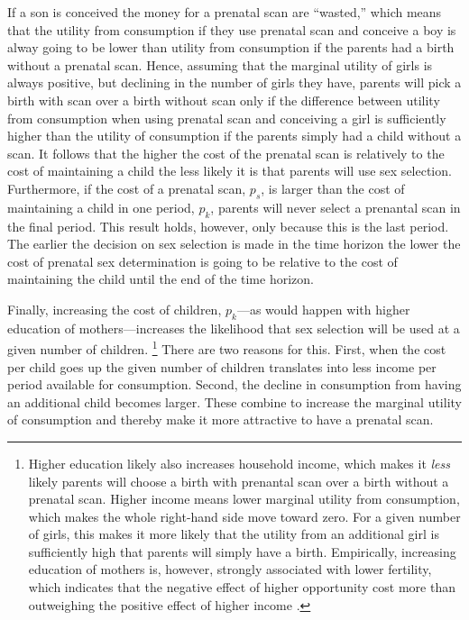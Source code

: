 \documentclass[12pt,letterpaper]{article}
\begin{document}
If a son is conceived the money for a prenatal scan are ``wasted,''
which means that the utility from consumption if they use prenatal scan
and conceive a boy is alway going to be lower than utility from consumption 
if the parents had a birth without a prenatal scan.
Hence, assuming that the marginal utility of girls is always positive,
but declining in the number of girls they have, parents will pick
a birth with scan over a birth without scan only if the difference between
utility from consumption when using prenatal scan and conceiving a girl
is sufficiently higher than the utility of consumption if the parents
simply had a child without a scan.
It follows that the higher the cost of the prenatal scan is relatively
to the cost of maintaining a child the less likely it is that parents will 
use sex selection.
Furthermore, if the cost of a prenatal scan, 
$p_s$, is larger than the cost of maintaining a child in one period, $p_k$, 
parents will never select a prenantal scan in the final period.
This result holds, however, only because this is the last period. 
The earlier the decision on sex selection is made in the time horizon
the lower the cost of prenatal sex determination is going to be 
relative to the cost of maintaining the child until the end of the time
horizon.

Finally, increasing the cost of children, $p_k$---as would happen 
with higher education of mothers---increases the likelihood that sex 
selection will be used at a given number of children.%
\footnote{
Higher education likely also increases household income, which
makes it \emph{less} likely parents will choose a birth with prenantal 
scan over a birth without a prenatal scan.
Higher income means lower marginal utility from consumption, which makes the 
whole right-hand side move toward zero.
For a given number of girls, this makes it more likely 
that the utility from an additional girl is sufficiently high that parents 
will simply have a birth.
Empirically, increasing education of mothers is, however, strongly associated 
with lower fertility, which indicates that 
the negative effect of higher opportunity cost more than outweighing 
the positive effect of higher income \citep{schultz97}.
}
There are two reasons for this.
First,  when the cost per child goes up the given number of children 
translates into less income per period available for consumption.
Second, the decline in consumption from having an additional
child becomes larger.
These combine to increase the marginal utility of consumption and thereby 
make it more attractive to have a prenatal scan.
\end{document}
